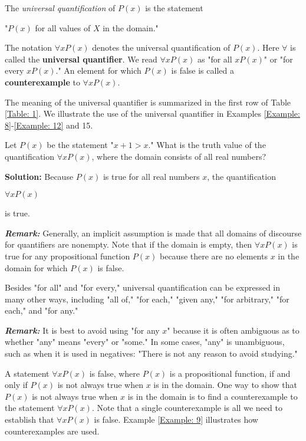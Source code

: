 \documentclass{Axon}
\begin{document}
\begin{definition}
    The \textit{universal quantification} of \(P(x)\) is the statement
    \begin{center}
        "\(P(x)\) for all values of \(X\) in the domain."
    \end{center}
    The notation \(\forall x P(x)\) denotes the universal quantification of \(P(x)\). Here \(\forall\) is called the \textbf{universal quantifier}. We read \(\forall x P(x)\) as "for all \(x P(x)\)" or "for every \(x P(x)\)." An element for which \(P(x)\) is false is called a \textbf{counterexample} to \(\forall x P(x)\).
\end{definition}

The meaning of the universal quantifier is summarized in the first row of Table \ref{Table: 1}. We illustrate the use of the universal quantifier in Examples \ref{Example: 8}-\ref{Example: 12} and 15.

\begin{example}\label{Example: 8}
    Let \(P(x)\) be the statement "\(x + 1 > x\)." What is the truth value of the quantification \(\forall x P(x)\), where the domain consists of all real numbers?

    \noindent
    \textbf{Solution:}
    Because \(P(x)\) is true for all real numbers \(x\), the quantification
    \begin{center}
        \(\forall x P(x)\)
    \end{center}
    is true.
\end{example}

\textbf{\textit{Remark:}} Generally, an implicit assumption is made that all domains of discourse for quantifiers are nonempty. Note that if the domain is empty, then \(\forall x P(x)\) is true for any propositional function \(P(x)\) because there are no elements \(x\) in the domain for which \(P(x)\) is false.

Besides "for all" and "for every," universal quantification can be expressed in many other ways, including "all of," "for each," "given any," "for arbitrary," "for each," and "for any."

\textbf{\textit{Remark:}} It is best to avoid using "for any \(x\)" because it is often ambiguous as to whether "any" means "every" or "some." In some cases, "any" is unambiguous, such as when it is used in negatives: "There is not any reason to avoid studying."

A statement \(\forall x P(x)\) is false, where \(P(x)\) is a propositional function, if and only if \(P(x)\) is not always true when \(x\) is in the domain. One way to show that \(P(x)\) is not always true when \(x\) is in the domain is to find a counterexample to the statement \(\forall x P(x)\). Note that a single counterexample is all we need to establish that \(\forall x P(x)\) is false. Example \ref{Example: 9} illustrates how counterexamples are used.
\end{document}
